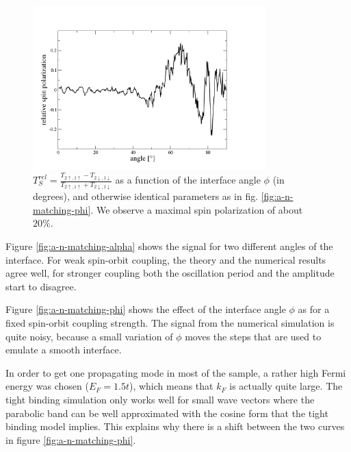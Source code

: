 \begin{figure}
    \begin{center}
        \includegraphics[width=0.8\textwidth]{relative-polarization-n-so.pdf}
    \end{center}
    \caption{$T_S^{rel} = \frac{T_{2\uparrow,1\uparrow} - T_{2\downarrow,1\downarrow}}
        {T_{2\uparrow,1\uparrow} + T_{2\downarrow,1\downarrow}}$ as
        a function of the interface angle $\phi$ (in degrees), and otherwise
        identical parameters as in fig. \ref{fig:a-n-matching-phi}.
        We observe a maximal spin polarization of about $20\%$.
        }
    \label{fig:n-so-rel}
\end{figure}

Figure \ref{fig:a-n-matching-alpha} shows the signal for two different
angles of the interface. For weak spin-orbit coupling, the theory and the
numerical results agree well, for stronger coupling both the oscillation
period and the amplitude start to disagree.

Figure \ref{fig:a-n-matching-phi} shows the effect of the interface angle
$\phi$ as for a fixed spin-orbit coupling strength. The signal from the
numerical simulation is quite noisy, because
a small variation of $\phi$ moves the steps that are used to emulate a smooth
interface.

In order to get one propagating mode in most of the sample, a rather
high Fermi energy was chosen ($E_F = 1.5t$), which means that $k_F$ is
actually quite large. The tight binding simulation only works well for small
wave vectors where the parabolic band can be well approximated with the
cosine form that the tight binding model implies. This explains why there is a
shift between the two curves in figure \ref{fig:a-n-matching-phi}.

